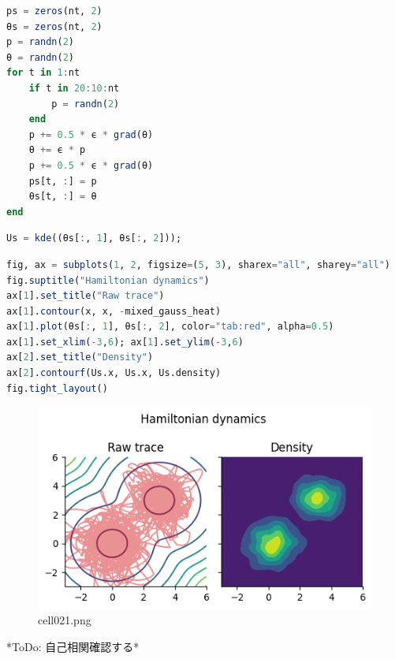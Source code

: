 \begin{lstlisting}[language=julia]
ps = zeros(nt, 2)
θs = zeros(nt, 2)
p = randn(2)
θ = randn(2)
for t in 1:nt
    if t in 20:10:nt
        p = randn(2)
    end
    p += 0.5 * ϵ * grad(θ)
    θ += ϵ * p
    p += 0.5 * ϵ * grad(θ)
    ps[t, :] = p
    θs[t, :] = θ
end
\end{lstlisting}
\begin{lstlisting}[language=julia]
Us = kde((θs[:, 1], θs[:, 2]));
\end{lstlisting}
\begin{lstlisting}[language=julia]
fig, ax = subplots(1, 2, figsize=(5, 3), sharex="all", sharey="all")
fig.suptitle("Hamiltonian dynamics")
ax[1].set_title("Raw trace")
ax[1].contour(x, x, -mixed_gauss_heat)
ax[1].plot(θs[:, 1], θs[:, 2], color="tab:red", alpha=0.5)
ax[1].set_xlim(-3,6); ax[1].set_ylim(-3,6)
ax[2].set_title("Density")
ax[2].contourf(Us.x, Us.x, Us.density)
fig.tight_layout()
\end{lstlisting}
\begin{figure}[ht]
	\centering
	\includegraphics[scale=0.8, max width=\linewidth]{./fig/bayesian-brain/mcmc/cell021.png}
	\caption{cell021.png}
	\label{cell021.png}
\end{figure}
*ToDo: 自己相関確認する*
